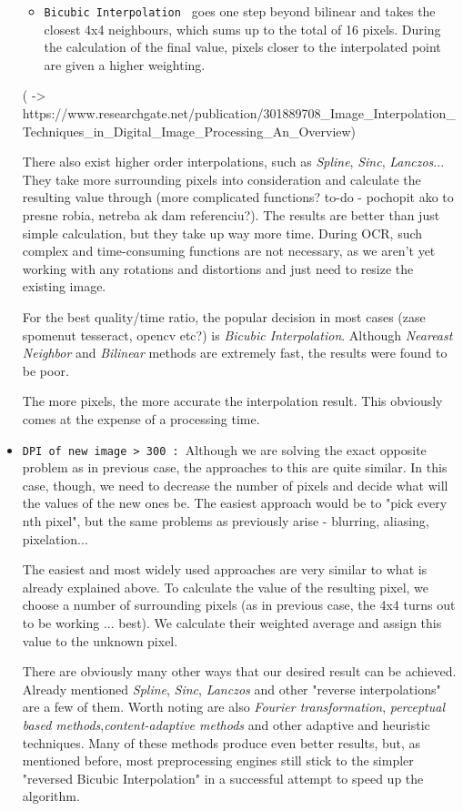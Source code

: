 \begin{itemize}
\begin{itemize}
\item\texttt {Bicubic Interpolation } goes one step beyond bilinear and takes the closest 4x4 neighbours, which sums up to the total of 16 pixels. During the calculation of the final value, pixels closer to the interpolated point are given a higher weighting.

\end{itemize}

( -> https://www.researchgate.net/publication/301889708_Image_Interpolation_Techniques_in_Digital_Image_Processing_An_Overview)

There also exist higher order interpolations, such as \emph{Spline}, \emph{Sinc}, \emph{Lanczos}... They take more surrounding pixels into consideration and calculate the resulting value through (more complicated functions? to-do - pochopit ako to presne robia, netreba ak dam referenciu?). The results are better than just simple calculation, but they take up way more time. During OCR, such complex and time-consuming functions are not necessary, as we aren't yet working with any rotations and distortions and just need to resize the existing image.

For the best quality/time ratio, the popular decision in most cases (zase spomenut tesseract, opencv etc?) is \emph{Bicubic Interpolation}. Although \emph{Neareast Neighbor} and \emph{Bilinear} methods are extremely fast, the results were found to be poor.

The more pixels, the more accurate the interpolation result. This obviously comes at the expense of a processing time.

\item\texttt {DPI of new image > 300 : }Although we are solving the exact opposite problem as in previous case, the approaches to this are quite similar. In this case, though, we need to decrease the number of pixels and decide what will the values of the new ones be. The easiest approach would be to "pick every nth pixel", but the same problems as previously arise - blurring, aliasing, pixelation...

The easiest and most widely used approaches are very similar to what is already explained above. To calculate the value of the resulting pixel, we choose a number of surrounding pixels (as in previous case, the 4x4 turns out to be working ... best). We calculate their weighted average and assign this value to the unknown pixel.

There are obviously many other ways that our desired result can be achieved. Already mentioned \emph{Spline}, \emph{Sinc}, \emph{Lanczos} and other "reverse interpolations" are a few of them. Worth noting are also \emph{Fourier transformation}, \emph{perceptual based methods},\emph{content-adaptive methods} and other adaptive and heuristic techniques.
Many of these methods produce even better results, but, as mentioned before, most preprocessing engines still stick to the simpler "reversed Bicubic Interpolation" in a successful attempt to speed up the algorithm.

\end{itemize}

